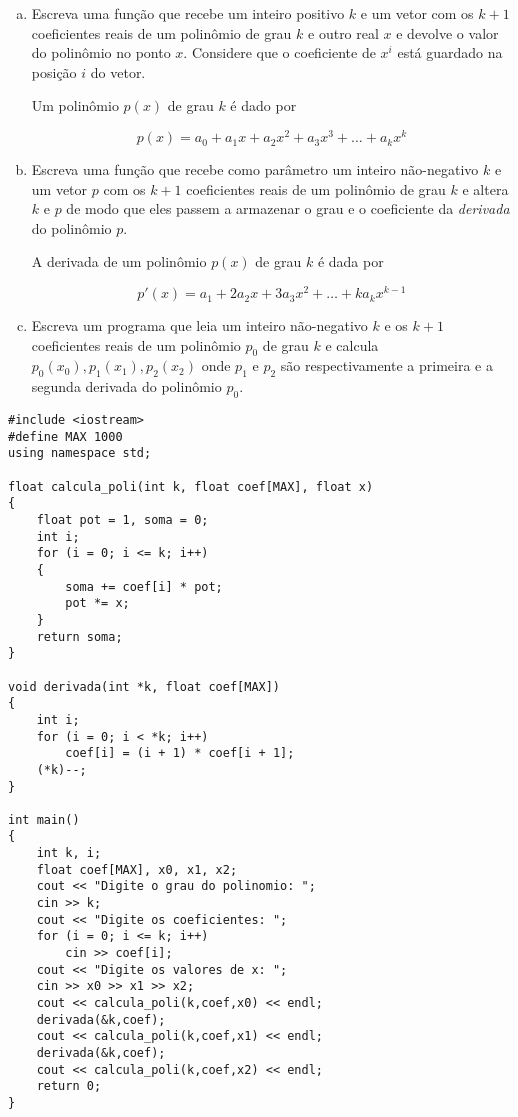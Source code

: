 \documentclass[a4paper]{memoir}
\begin{document}
\begin{prob}\label{prob305.cpp}
\begin{enumerate}[a)]
 \item Escreva uma função que recebe um inteiro positivo $k$ e um vetor com os $k + 1$ coeficientes reais de um polinômio de grau $k$ e outro real $x$ e devolve o valor do polinômio no ponto $x$. Considere que o coeficiente de $x^i$ está guardado na posição $i$ do vetor.

Um polinômio $p(x)$ de grau $k$ é dado por

\[
p(x) = a_0 + a_1 x + a_2 x^2 + a_3 x^3 + \ldots + a_k x^k
\]

  \item Escreva uma função que recebe como parâmetro um inteiro não-negativo $k$ e um vetor $p$ com os $k + 1$ coeficientes reais de um polinômio de grau $k$ e altera $k$ e $p$ de modo que eles passem a armazenar o grau e o coeficiente da \emph{derivada}  do polinômio $p$.

A derivada de um polinômio $p(x)$ de grau $k$ é dada por

\[
p'(x) = a_1 + 2 a_2 x + 3 a_3 x^2 + \ldots + k a_k x^{k-1}
\]

  \item Escreva um programa que leia um inteiro não-negativo $k$ e os $k + 1$ coeficientes reais de um polinômio $p_0$ de grau $k$ e calcula $p_0 (x_0), p_1 (x_1), p_2 (x_2)$ onde $p_1$ e $p_2$ são respectivamente a primeira e a segunda derivada do polinômio $p_0$.

\end{enumerate}

\end{prob}

\begin{sol}
\begin{lstlisting}
#include <iostream>
#define MAX 1000
using namespace std;

float calcula_poli(int k, float coef[MAX], float x)
{
    float pot = 1, soma = 0;
    int i;
    for (i = 0; i <= k; i++)
    {
        soma += coef[i] * pot;
        pot *= x;
    }
    return soma;
}

void derivada(int *k, float coef[MAX])
{
    int i;
    for (i = 0; i < *k; i++)
        coef[i] = (i + 1) * coef[i + 1];
    (*k)--;
}

int main()
{
    int k, i;
    float coef[MAX], x0, x1, x2;
    cout << "Digite o grau do polinomio: ";
    cin >> k;
    cout << "Digite os coeficientes: ";
    for (i = 0; i <= k; i++)
        cin >> coef[i];
    cout << "Digite os valores de x: ";
    cin >> x0 >> x1 >> x2;
    cout << calcula_poli(k,coef,x0) << endl;
    derivada(&k,coef);
    cout << calcula_poli(k,coef,x1) << endl;
    derivada(&k,coef);
    cout << calcula_poli(k,coef,x2) << endl;
    return 0;
}
\end{lstlisting}
\end{sol}
\end{document}

